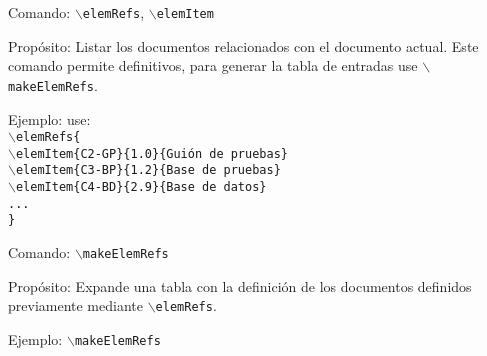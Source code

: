 \begin{Cdescription}
	\item[Comando:] {\tt $\backslash$elemRefs}, {\tt $\backslash$elemItem}
	\item[Propósito:] Listar los documentos relacionados con el documento actual. Este comando permite definitivos, para generar la tabla de entradas use {\tt $\backslash$makeElemRefs}.
	\item[Ejemplo:]use:\\
	{\tt $\backslash$elemRefs\{\\
               \hspace*{1cm}$\backslash$elemItem\{C2-GP\}\{1.0\}\{Guión de pruebas\}\\
               \hspace*{1cm}$\backslash$elemItem\{C3-BP\}\{1.2\}\{Base de pruebas\}\\
               \hspace*{1cm}$\backslash$elemItem\{C4-BD\}\{2.9\}\{Base de datos\}\\
               \hspace*{1cm}...\\
           \}}
\end{Cdescription}
%
\begin{Cdescription}
	\item[Comando:] {\tt $\backslash$makeElemRefs}
	\item[Propósito:] Expande una tabla con la definición de los documentos definidos previamente mediante {\tt $\backslash$elemRefs}.
	\item[Ejemplo:] {\tt $\backslash$makeElemRefs}
\end{Cdescription}
%
%
%
